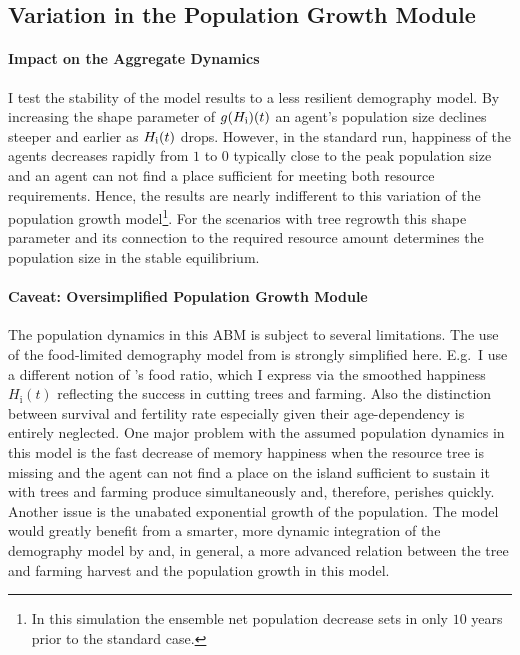 \FloatBarrier
\subsection{Variation in the Population Growth Module}

\paragraph{Impact on the Aggregate Dynamics}
I test the stability of the model results to a less resilient demography model.
By increasing the shape parameter of $g(H_{\rm i})(t)$ an agent's population size declines steeper and earlier as $H_{\rm i}(t)$ drops.
However, in the standard run, happiness of the agents decreases rapidly from $1$ to $0$ typically close to the peak population size and an agent can not find a place sufficient for meeting both resource requirements.
Hence, the results are nearly indifferent to this variation of the population growth model\footnote{In this simulation the ensemble net population decrease sets in only $10$ years prior to the standard case.}.
For the scenarios with tree regrowth this shape parameter and its connection to the required resource amount determines the population size in the stable equilibrium.

\paragraph{Caveat: Oversimplified Population Growth Module}
The population dynamics in this ABM is subject to several limitations.
The use of the food-limited demography model from \citet{Puleston2017} is strongly simplified here.
E.g.\ I use a different notion of \citet{Puleston2017}'s food ratio, which I express via the smoothed happiness $H_\text{i}(t)$ reflecting the success in cutting trees and farming.
Also the distinction between survival and fertility rate especially given their age-dependency is entirely neglected.
One major problem with the assumed population dynamics in this model is the fast decrease of memory happiness when the resource tree is missing and the agent can not find a place on the island sufficient to sustain it with trees and farming produce simultaneously and, therefore, perishes quickly.
Another issue is the unabated exponential growth of the population.
The model would greatly benefit from a smarter, more dynamic integration of the demography model by \citet{Puleston2017} and, in general, a more advanced relation between the tree and farming harvest and the population growth in this model.



